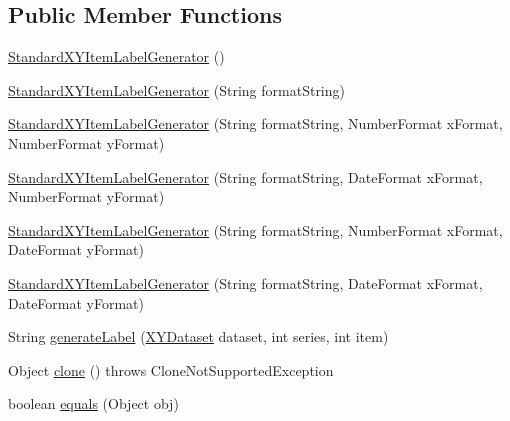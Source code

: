 \subsection*{Public Member Functions}
\begin{DoxyCompactItemize}
\item 
\mbox{\hyperlink{classorg_1_1jfree_1_1chart_1_1labels_1_1_standard_x_y_item_label_generator_a4da55462e798496717f4d9728b238258}{Standard\+X\+Y\+Item\+Label\+Generator}} ()
\item 
\mbox{\hyperlink{classorg_1_1jfree_1_1chart_1_1labels_1_1_standard_x_y_item_label_generator_af70438b290ccac18052d72fdb486d68d}{Standard\+X\+Y\+Item\+Label\+Generator}} (String format\+String)
\item 
\mbox{\hyperlink{classorg_1_1jfree_1_1chart_1_1labels_1_1_standard_x_y_item_label_generator_a93e76a0432f95d6cf57fd9bd4349b148}{Standard\+X\+Y\+Item\+Label\+Generator}} (String format\+String, Number\+Format x\+Format, Number\+Format y\+Format)
\item 
\mbox{\hyperlink{classorg_1_1jfree_1_1chart_1_1labels_1_1_standard_x_y_item_label_generator_a6006c07ca5ecfcf38539dfae8f7ebac1}{Standard\+X\+Y\+Item\+Label\+Generator}} (String format\+String, Date\+Format x\+Format, Number\+Format y\+Format)
\item 
\mbox{\hyperlink{classorg_1_1jfree_1_1chart_1_1labels_1_1_standard_x_y_item_label_generator_aa63a057de8486cc0662915c78f89ece6}{Standard\+X\+Y\+Item\+Label\+Generator}} (String format\+String, Number\+Format x\+Format, Date\+Format y\+Format)
\item 
\mbox{\hyperlink{classorg_1_1jfree_1_1chart_1_1labels_1_1_standard_x_y_item_label_generator_a5c0b8639925efecff0734fa509e89d5f}{Standard\+X\+Y\+Item\+Label\+Generator}} (String format\+String, Date\+Format x\+Format, Date\+Format y\+Format)
\item 
String \mbox{\hyperlink{classorg_1_1jfree_1_1chart_1_1labels_1_1_standard_x_y_item_label_generator_a488c11e6e0c44ca7083f56f54f132636}{generate\+Label}} (\mbox{\hyperlink{interfaceorg_1_1jfree_1_1data_1_1xy_1_1_x_y_dataset}{X\+Y\+Dataset}} dataset, int series, int item)
\item 
Object \mbox{\hyperlink{classorg_1_1jfree_1_1chart_1_1labels_1_1_standard_x_y_item_label_generator_aeb63267879e4e4c708cc053d79371230}{clone}} ()  throws Clone\+Not\+Supported\+Exception 
\item 
boolean \mbox{\hyperlink{classorg_1_1jfree_1_1chart_1_1labels_1_1_standard_x_y_item_label_generator_afea0f499c43af8defbd72d647510b310}{equals}} (Object obj)
\end{DoxyCompactItemize}
